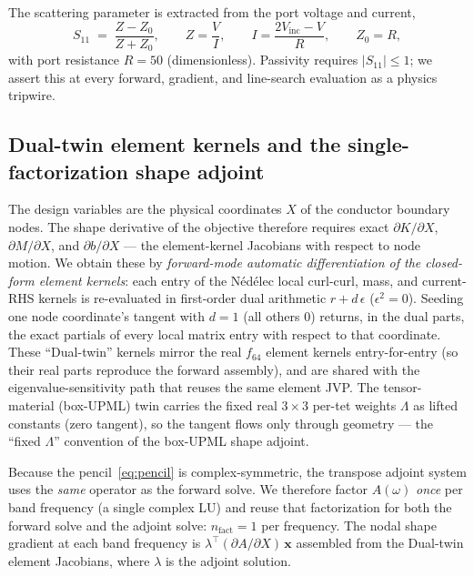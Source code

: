 \documentclass{anvil-paper}
\begin{document}
The scattering parameter is extracted from the port voltage and current,
\begin{equation}
  S_{11} \;=\; \frac{Z-Z_0}{Z+Z_0}, \qquad Z=\frac{V}{I}, \qquad
  I=\frac{2V_{\text{inc}}-V}{R}, \qquad Z_0=R,
  \label{eq:s11}
\end{equation}
with port resistance $R=50$ (dimensionless). Passivity requires
$|S_{11}|\le 1$; we assert this at every forward, gradient, and line-search
evaluation as a physics tripwire.

\subsection{Dual-twin element kernels and the single-factorization shape adjoint}
\label{sec:adjoint}

The design variables are the physical coordinates $X$ of the conductor boundary
nodes. The shape derivative of the objective therefore requires exact
$\partial K/\partial X$, $\partial M/\partial X$, and $\partial b/\partial X$
--- the element-kernel Jacobians with respect to node motion. We obtain these by
\emph{forward-mode automatic differentiation of the closed-form element
kernels}: each entry of the N\'ed\'elec local curl-curl, mass, and current-RHS
kernels is re-evaluated in first-order dual arithmetic $r+d\,\epsilon$
($\epsilon^2=0$). Seeding one node coordinate's tangent with $d=1$ (all others
$0$) returns, in the dual parts, the exact partials of every local matrix entry
with respect to that coordinate. These ``Dual-twin'' kernels mirror the real
$f_{64}$ element kernels entry-for-entry (so their real parts reproduce the
forward assembly), and are shared with the eigenvalue-sensitivity path that
reuses the same element JVP. The tensor-material (box-UPML) twin carries the
fixed real $3\times 3$ per-tet weights $\Lambda$ as lifted constants (zero
tangent), so the tangent flows only through geometry --- the ``fixed $\Lambda$''
convention of the box-UPML shape adjoint.

Because the pencil~\eqref{eq:pencil} is complex-symmetric, the transpose adjoint
system uses the \emph{same} operator as the forward solve. We therefore factor
$A(\omega)$ \emph{once} per band frequency (a single complex LU) and reuse that
factorization for both the forward solve and the adjoint solve:
$n_{\text{fact}}=1$ per frequency. The nodal shape gradient at each band
frequency is $\lambda^{\!\top}(\partial A/\partial X)\,\mathbf{x}$ assembled from
the Dual-twin element Jacobians, where $\lambda$ is the adjoint solution.
\end{document}
